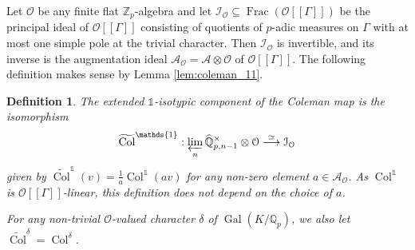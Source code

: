 \documentclass[12pt]{amsart}
\newcommand\bQ{\mathbb{Q}}
\newcommand\Zp{{\mathbb{Z}_p}}
\newcommand\Qp{{\mathbb{Q}_p}}
\newcommand\cA{\mathcal{A}}
\newcommand\cI{\mathcal{I}}
\newcommand\cO{\mathcal{O}}
\DeclareMathOperator{\Gal}{Gal}
\DeclareMathOperator{\Frac}{Frac}
\DeclareMathOperator{\Coleman}{Col}
\theoremstyle{defstyle}
\newtheorem{definition}[subsubsection]{Definition}
\theoremstyle{thmstyle}
\begin{document}
Let $\cO$ be any finite flat $\Zp$-algebra and let $\cI_\cO \subseteq \Frac(\cO[[\Gamma]])$ be the principal ideal of $\cO[[\Gamma]]$ consisting of quotients of $p$-adic measures on $\Gamma$ with at most one simple pole at the trivial character. Then $\cI_\cO$ is invertible, and its inverse is the augmentation ideal $\cA_\cO=\cA\otimes \cO$ of $\cO[[\Gamma]]$. The following definition makes sense by Lemma \ref{lem:coleman_11}.
\begin{definition}\label{def:coleman_isotypic_extended}
	The extended $\mathds{1}$-isotypic component of the Coleman map is the isomorphism
	$$\widetilde{\Coleman}^\mathds{1} : \varprojlim_n \widehat{\bQ}^\times_{p,n-1} \otimes \cO \overset{\simeq}{\longrightarrow} \cI_\cO$$
	given by $\widetilde{\Coleman}^\mathds{1}(v)=\frac{1}{a}\Coleman^\mathds{1}(av)$ for any non-zero element $a\in \cA_\cO$. As $\Coleman^\mathds{1}$ is $\cO[[\Gamma]]$-linear, this definition does not depend on the choice of $a$. 
	
	For any non-trivial $\cO$-valued character $\delta$ of $\Gal(K/\Qp)$, we also let $\widetilde{\Coleman}^\delta=\Coleman^\delta$.
\end{definition}
\end{document}
